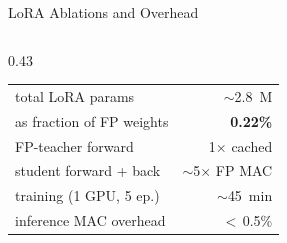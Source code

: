 \begin{frame}[shrink=10]{LoRA Ablations and Overhead}
\begin{columns}[T]
\begin{column}{0.43\textwidth}
\begin{center}
      \renewcommand{\arraystretch}{1.2}
      \begin{tabular}{@{}l r@{}}
        \toprule
        total LoRA params & $\sim$\SI{2.8}{M} \\
        as fraction of FP weights & \textbf{0.22\%} \\
        FP-teacher forward & 1$\times$ cached \\
        student forward + back & $\sim$5$\times$ FP MAC \\
        training (1 GPU, 5 ep.) & $\sim$\SI{45}{min} \\
        inference MAC overhead & $<$\,0.5\% \\
        \bottomrule
      \end{tabular}
      \end{center}

    \end{column}
  \end{columns}
\end{frame}
